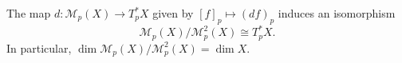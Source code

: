 The map $d: \mathcal{M}_p(X) \to T_p^*X$ given by $[f]_p \mapsto (df)_p$ induces an isomorphism
$$\mathcal{M}_p(X) / \mathcal{M}_p^2(X) \cong T_p^*X.$$
In particular, $\dim \mathcal{M}_p(X)/\mathcal{M}_p^2(X) = \dim X$.
